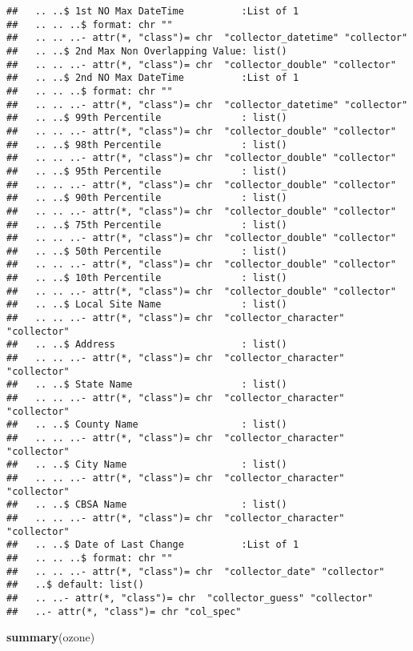 \documentclass[]{article}
\newenvironment{Shaded}{\begin{snugshade}}{\end{snugshade}}
\newcommand{\KeywordTok}[1]{\textcolor[rgb]{0.13,0.29,0.53}{\textbf{#1}}}
\newcommand{\NormalTok}[1]{#1}
\begin{document}
\begin{verbatim}
##   .. ..$ 1st NO Max DateTime          :List of 1
##   .. .. ..$ format: chr ""
##   .. .. ..- attr(*, "class")= chr  "collector_datetime" "collector"
##   .. ..$ 2nd Max Non Overlapping Value: list()
##   .. .. ..- attr(*, "class")= chr  "collector_double" "collector"
##   .. ..$ 2nd NO Max DateTime          :List of 1
##   .. .. ..$ format: chr ""
##   .. .. ..- attr(*, "class")= chr  "collector_datetime" "collector"
##   .. ..$ 99th Percentile              : list()
##   .. .. ..- attr(*, "class")= chr  "collector_double" "collector"
##   .. ..$ 98th Percentile              : list()
##   .. .. ..- attr(*, "class")= chr  "collector_double" "collector"
##   .. ..$ 95th Percentile              : list()
##   .. .. ..- attr(*, "class")= chr  "collector_double" "collector"
##   .. ..$ 90th Percentile              : list()
##   .. .. ..- attr(*, "class")= chr  "collector_double" "collector"
##   .. ..$ 75th Percentile              : list()
##   .. .. ..- attr(*, "class")= chr  "collector_double" "collector"
##   .. ..$ 50th Percentile              : list()
##   .. .. ..- attr(*, "class")= chr  "collector_double" "collector"
##   .. ..$ 10th Percentile              : list()
##   .. .. ..- attr(*, "class")= chr  "collector_double" "collector"
##   .. ..$ Local Site Name              : list()
##   .. .. ..- attr(*, "class")= chr  "collector_character" "collector"
##   .. ..$ Address                      : list()
##   .. .. ..- attr(*, "class")= chr  "collector_character" "collector"
##   .. ..$ State Name                   : list()
##   .. .. ..- attr(*, "class")= chr  "collector_character" "collector"
##   .. ..$ County Name                  : list()
##   .. .. ..- attr(*, "class")= chr  "collector_character" "collector"
##   .. ..$ City Name                    : list()
##   .. .. ..- attr(*, "class")= chr  "collector_character" "collector"
##   .. ..$ CBSA Name                    : list()
##   .. .. ..- attr(*, "class")= chr  "collector_character" "collector"
##   .. ..$ Date of Last Change          :List of 1
##   .. .. ..$ format: chr ""
##   .. .. ..- attr(*, "class")= chr  "collector_date" "collector"
##   ..$ default: list()
##   .. ..- attr(*, "class")= chr  "collector_guess" "collector"
##   ..- attr(*, "class")= chr "col_spec"
\end{verbatim}

\begin{Shaded}
\begin{Highlighting}[]
\KeywordTok{summary}\NormalTok{(ozone)}
\end{Highlighting}
\end{Shaded}
\end{document}

